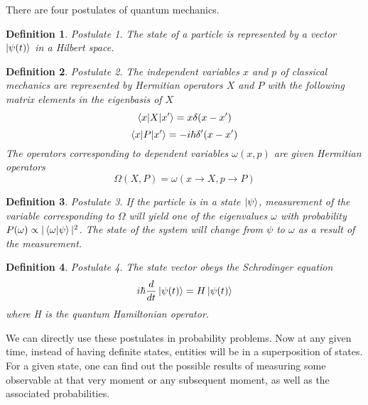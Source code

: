\documentclass{tufte-book}
\newtheorem{definition}{Definition}
\begin{document}
There are four postulates of quantum mechanics.
\begin{definition}
  \label{def:17}
  Postulate 1. The state of a particle is represented by a vector $\ket{\psi(t)}$ in a Hilbert space.
\end{definition}
\begin{definition}
  \label{def:18}
  Postulate 2. The independent variables $x$ and $p$ of classical mechanics are represented by Hermitian operators $X$ and $P$ with the following matrix elements in the eigenbasis of $X$
	\[\braket{x|X|x'} = x\delta(x-x')\]
	\[\braket{x|P|x'} = -i\hbar\delta'(x-x')\]
	The operators corresponding to dependent variables $\omega(x, p)$ are given Hermitian operators
	\[\Omega(X, P) = \omega(x\rightarrow X, p\rightarrow P)\]
\end{definition}
\begin{definition}
  \label{def:19}
  Postulate 3. If the particle is in a state $\ket{\psi}$, measurement of the variable corresponding to $\Omega$ will yield one of the eigenvalues $\omega$ with probability $P(\omega)\propto|\braket{\omega|\psi}|^2$. The state of the system will change from $\psi$ to $\omega$ as a result of the measurement.
\end{definition}
\begin{definition}
  \label{def:20}
  Postulate 4. The state vector obeys the Schrodinger equation
	\[i\hbar\frac{d}{dt}\ket{\psi(t)} = H\ket{\psi(t)}\]
	where H is the quantum Hamiltonian operator.
\end{definition}

We can directly use these postulates in probability problems. Now at any given time, instead of having definite states, entities will be in a superposition of states. For a given state, one can find out the possible results of measuring some observable at that very moment or any subsequent moment, as well as the associated probabilities.


	\backmatter

	
	


	\printindex
\end{document}
